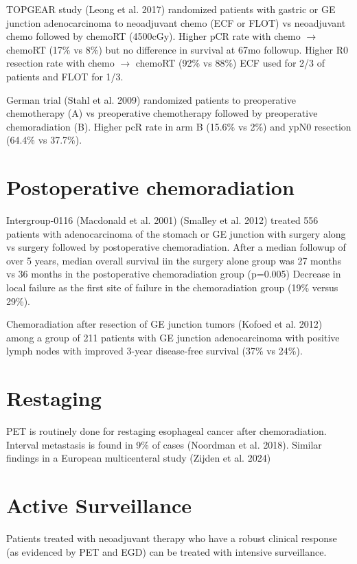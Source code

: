 \documentclass[
  letterpaper,
]{scrbook}
\begin{document}
TOPGEAR study (Leong et al. 2017) randomized patients with gastric or GE
junction adenocarcinoma to neoadjuvant chemo (ECF or FLOT) vs
neoadjuvant chemo followed by chemoRT (4500cGy). Higher pCR rate with
chemo \(\rightarrow\) chemoRT (17\% vs 8\%) but no difference in
survival at 67mo followup. Higher R0 resection rate with chemo
\(\rightarrow\) chemoRT (92\% vs 88\%) ECF used for 2/3 of patients and
FLOT for 1/3.

German trial (Stahl et al. 2009) randomized patients to preoperative
chemotherapy (A) vs preoperative chemotherapy followed by preoperative
chemoradiation (B). Higher pcR rate in arm B (15.6\% vs 2\%) and ypN0
resection (64.4\% vs 37.7\%).

\section{Postoperative
chemoradiation}\label{postoperative-chemoradiation}

Intergroup-0116 (Macdonald et al. 2001) (Smalley et al. 2012) treated
556 patients with adenocarcinoma of the stomach or GE junction with
surgery along vs surgery followed by postoperative chemoradiation. After
a median followup of over 5 years, median overall survival iin the
surgery alone group was 27 months vs 36 months in the postoperative
chemoradiation group (p=0.005) Decrease in local failure as the first
site of failure in the chemoradiation group (19\% versus 29\%).

Chemoradiation after resection of GE junction tumors (Kofoed et al.
2012) among a group of 211 patients with GE junction adenocarcinoma with
positive lymph nodes with improved 3-year disease-free survival (37\% vs
24\%).

\section{Restaging}\label{restaging-1}

PET is routinely done for restaging esophageal cancer after
chemoradiation. Interval metastasis is found in 9\% of cases (Noordman
et al. 2018). Similar findings in a European multicenteral study (Zijden
et al. 2024)

\section{Active Surveillance}\label{active-surveillance}

Patients treated with neoadjuvant therapy who have a robust clinical
response (as evidenced by PET and EGD) can be treated with intensive
surveillance.
\end{document}
